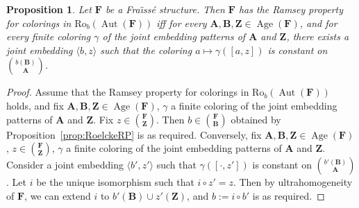 \documentclass[10pt,a4paper]{article}
\newtheorem{prop}[theo]{Proposition}
\theoremstyle{definition}
\numberwithin{equation}{section}
\numberwithin{figure}{section}
\numberwithin{table}{section}
\newcommand*{\mA}{\mathbf{A}}
\newcommand*{\mB}{\mathbf{B}}
\newcommand*{\mF}{\mathbf{F}}
\newcommand*{\mZ}{\mathbf{Z}}
\DeclareMathOperator{\Aut}{Aut}
\DeclareMathOperator{\Age}{Age}
\newcommand{\ROB}{\mathrm{Ro}_{b}}
\begin{document}
\begin{prop}\label{prop:RPRoelcke}
Let $\mF$ be a Fra\"{\i}ss\'e structure. Then $\mF$ has the Ramsey property for colorings in $\ROB(\Aut(\mF))$ iff for every $\mA, \mB, \mZ\in \Age(\mF)$, and for every finite coloring $\gamma$ of the joint embedding patterns of $\mA$ and $\mZ$, there exists a joint embedding $\langle b,z\rangle$ such that the coloring $a\mapsto \gamma([a,z])$ is constant on $\binom{b(\mB)}{\mA}$.
\end{prop}

\begin{proof}
Assume that the Ramsey property for colorings in $\ROB(\Aut(\mF))$ holds, and fix $\mA, \mB, \mZ\in \Age(\mF)$, $\gamma$ a finite coloring of the joint embedding patterns of $\mA$ and $\mZ$. Fix $z\in \binom{\mF}{\mZ}$. Then $b\in \binom{\mF}{\mB}$ obtained by Proposition~\ref{prop:RoelckeRP} is as required. Conversely, fix $\mA, \mB, \mZ\in \Age(\mF)$, $z\in \binom{\mF}{\mZ}$, $\gamma$ a finite coloring of the joint embedding patterns of $\mA$ and $\mZ$. Consider a joint embedding $\langle b',z'\rangle$ such that $\gamma([\cdot,z'])$ is constant on $\binom{b'(\mB)}{\mA}$. Let $i$ be the unique isomorphism such that $i\circ z'=z$. Then by ultrahomogeneity of $\mF$, we can extend $i$ to $b'(\mB)\cup z'(\mZ)$, and $b:=i\circ b'$ is as required.
\end{proof}
\end{document}
